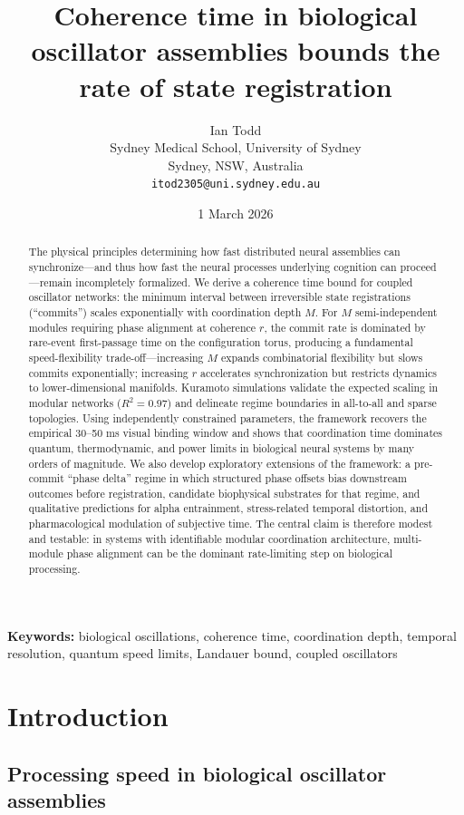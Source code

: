 \documentclass[12pt]{article}
\title{Coherence time in biological oscillator assemblies bounds the rate of state registration}
\author{Ian Todd\\
Sydney Medical School, University of Sydney\\
Sydney, NSW, Australia\\
\texttt{itod2305@uni.sydney.edu.au}}
\date{1 March 2026}
\begin{document}
\maketitle

\begin{abstract}
The physical principles determining how fast distributed neural assemblies can synchronize---and thus how fast the neural processes underlying cognition can proceed---remain incompletely formalized. We derive a coherence time bound for coupled oscillator networks: the minimum interval between irreversible state registrations (``commits'') scales exponentially with coordination depth $M$. For $M$ semi-independent modules requiring phase alignment at coherence $r$, the commit rate is dominated by rare-event first-passage time on the configuration torus, producing a fundamental speed-flexibility trade-off---increasing $M$ expands combinatorial flexibility but slows commits exponentially; increasing $r$ accelerates synchronization but restricts dynamics to lower-dimensional manifolds. Kuramoto simulations validate the expected scaling in modular networks ($R^2 = 0.97$) and delineate regime boundaries in all-to-all and sparse topologies. Using independently constrained parameters, the framework recovers the empirical 30--50 ms visual binding window and shows that coordination time dominates quantum, thermodynamic, and power limits in biological neural systems by many orders of magnitude. We also develop exploratory extensions of the framework: a pre-commit ``phase delta'' regime in which structured phase offsets bias downstream outcomes before registration, candidate biophysical substrates for that regime, and qualitative predictions for alpha entrainment, stress-related temporal distortion, and pharmacological modulation of subjective time. The central claim is therefore modest and testable: in systems with identifiable modular coordination architecture, multi-module phase alignment can be the dominant rate-limiting step on biological processing.
\end{abstract}

\textbf{Keywords:} biological oscillations, coherence time, coordination depth, temporal resolution, quantum speed limits, Landauer bound, coupled oscillators

\section{Introduction}

\subsection{Processing speed in biological oscillator assemblies}
\end{document}
